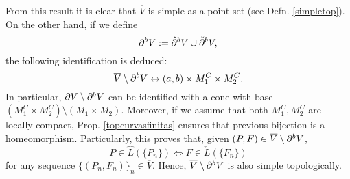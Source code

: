From this result it is clear that $\overline{V}$ is simple as a point set (see Defn. \ref{simpletop}). On the other hand, if we define
\[
\partial^{b}V:=\hat{\partial}^{b}V\cup\check{\partial}^{b}V,
\]
the following identification is deduced:
\[
\overline{V}\setminus \partial^{b} V\leftrightarrow (a,b) \times M_1^C\times M_2^C.
  \]
  In particular, $\partial V\setminus \partial^{b} V$ can be identified with a cone with base $(M_1^C\times M_2^C)\setminus (M_1\times M_2)$. Moreover, if we assume that both $M_1^C,M_2^C$ are locally compact, Prop. \ref{topcurvasfinitas} ensures that previous bijection is a homeomorphism. Particularly, this proves that, given $(P,F)\in \overline{V}\setminus \partial^{b}V$,
    \[
P\in \hat{L}(\{P_n\}) \iff F\in \check{L}(\{F_n\})
      \]
      for any sequence $\{(P_n,F_n)\}_n\in \overline{V}$. Hence, $\overline{V}\setminus \partial^{b}V$ is also simple topologically.


